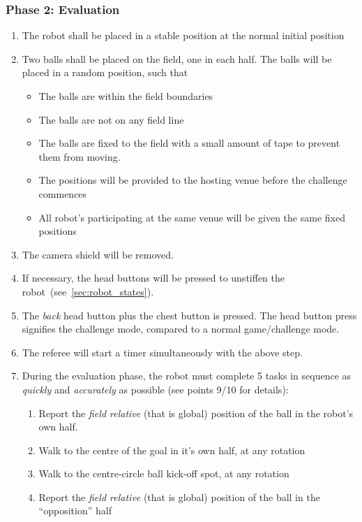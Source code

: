 \subsubsection{Phase 2: Evaluation}

\begin{enumerate}
    \item The robot shall be placed in a stable position at the normal initial position
    \item Two balls shall be placed on the field, one in each half. The balls will be placed in a random position, such that
    \begin{itemize}
        \item The balls are within the field boundaries
        \item The balls are not on any field line
        \item The balls are fixed to the field with a small amount of tape to prevent them from moving.
        \item The positions will be provided to the hosting venue before the challenge commences
        \item All robot's participating at the same venue will be given the same fixed positions
    \end{itemize}
    \item The camera shield will be removed.
    \item If necessary, the head buttons will be pressed to unstiffen the robot~(see~\ref{sec:robot_states}).
    \item The \textit{back} head button plus the chest button is pressed. The head button press signifies the challenge mode, compared to a normal game/challenge mode.
    \item The referee will start a timer simultaneously with the above step.
    \item During the evaluation phase, the robot must complete 5 tasks in sequence as \textit{quickly} and \textit{accurately} as possible (see points 9/10 for details):
    \begin{enumerate}
        \item Report the \textit{field relative} (that is global) position of the ball in the robot's own half.
        \item Walk to the centre of the goal in it's own half, at any rotation
        \item Walk to the centre-circle ball kick-off spot, at any rotation
        \item Report the \textit{field relative} (that is global) position of the ball in the ``opposition'' half

\end{enumerate}
\end{enumerate}
